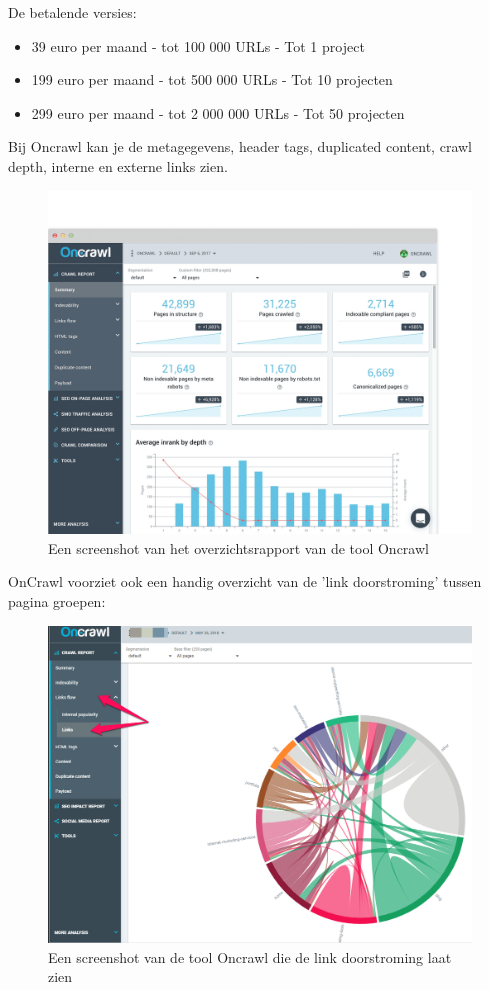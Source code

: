 De betalende versies: 
\begin{itemize}
\item 39 euro per maand - tot 100 000 URLs - Tot 1 project
\item 199 euro per maand - tot 500 000 URLs - Tot 10 projecten
\item 299 euro per maand - tot 2 000 000 URLs - Tot 50 projecten
\end{itemize}

Bij Oncrawl kan je de metagegevens, header tags, duplicated content, crawl depth, interne en externe links zien. 

\begin{figure}[h!]
\centering
\includegraphics[width=\linewidth]{img/crawl-report.png}
\caption{Een screenshot van het overzichtsrapport van de tool Oncrawl
\autocite{oncrawl}}
\end{figure}

OnCrawl voorziet ook een handig overzicht van de 'link doorstroming' tussen pagina groepen: 

\begin{figure}[h!]
\centering
\includegraphics[width=\linewidth]{img/oncrawl-link-visualization.png}\caption{Een screenshot van de tool Oncrawl die de link doorstroming laat zien
\autocite{oncrawl}}
\end{figure}

